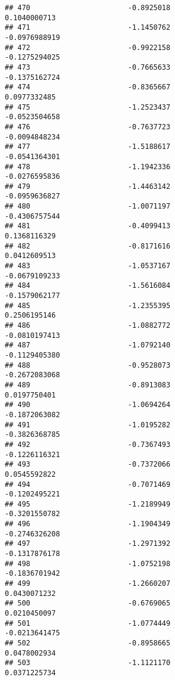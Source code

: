 \documentclass[
]{article}
\begin{document}
\begin{verbatim}
## 470                       -0.8925018                          0.1040000713
## 471                       -1.1450762                         -0.0976988919
## 472                       -0.9922158                         -0.1275294025
## 473                       -0.7665633                         -0.1375162724
## 474                       -0.8365667                          0.0977332485
## 475                       -1.2523437                         -0.0523504658
## 476                       -0.7637723                         -0.0094848234
## 477                       -1.5188617                         -0.0541364301
## 478                       -1.1942336                         -0.0276595836
## 479                       -1.4463142                         -0.0959636827
## 480                       -1.0071197                         -0.4306757544
## 481                       -0.4099413                          0.1368116329
## 482                       -0.8171616                          0.0412609513
## 483                       -1.0537167                         -0.0679109233
## 484                       -1.5616084                         -0.1579062177
## 485                       -1.2355395                          0.2506195146
## 486                       -1.0882772                         -0.0810197413
## 487                       -1.0792140                         -0.1129405380
## 488                       -0.9528073                         -0.2672083068
## 489                       -0.8913083                          0.0197750401
## 490                       -1.0694264                         -0.1872063082
## 491                       -1.0195282                         -0.3826368785
## 492                       -0.7367493                         -0.1226116321
## 493                       -0.7372066                          0.0545592822
## 494                       -0.7071469                         -0.1202495221
## 495                       -1.2189949                         -0.3201550782
## 496                       -1.1904349                         -0.2746326208
## 497                       -1.2971392                         -0.1317876178
## 498                       -1.0752198                         -0.1836701942
## 499                       -1.2660207                          0.0430071232
## 500                       -0.6769065                          0.0210450097
## 501                       -1.0774449                         -0.0213641475
## 502                       -0.8958665                          0.0478002934
## 503                       -1.1121170                          0.0371225734

\end{verbatim}
\end{document}
